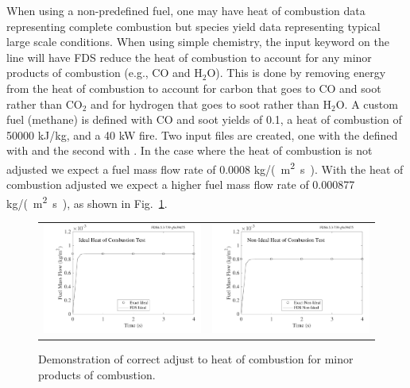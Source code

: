 \documentclass[11pt]{book}
\begin{document}
When using a non-predefined fuel, one may have heat of combustion data representing complete combustion but species yield data representing typical large scale conditions.  When using simple chemistry, the input keyword  on the  line will have FDS reduce the heat of combustion to account for any minor products of combustion (e.g., CO and H$_2$O).  This is done by removing energy from the heat of combustion to account for carbon that goes to CO and soot rather than CO$_2$ and for hydrogen that goes to soot rather than H$_2$O.  A custom fuel (methane) is defined with CO and soot yields of 0.1, a heat of combustion of 50000 kJ/kg, and a 40 kW fire.  Two input files are created, one with the  defined with  and the second with .  In the  case where the heat of combustion is not adjusted we expect a fuel mass flow rate of 0.0008 \si{kg/(m^2.s)}.  With the heat of combustion adjusted we expect a higher fuel mass flow rate of 0.000877 \si{kg/(m^2.s)}, as shown in Fig.~\ref{fig:HoC}.
\begin{figure}[h!]
\begin{tabular*}{\textwidth}{lr}
\includegraphics[width=3.2in]{SCRIPT_FIGURES/HoC_Ideal} &
\includegraphics[width=3.2in]{SCRIPT_FIGURES/HoC_NonIdeal}
\end{tabular*}
\caption[ and  test cases]{Demonstration of correct adjust to heat of combustion for minor products of combustion.}
\label{fig:HoC}
\end{figure}
\end{document}
